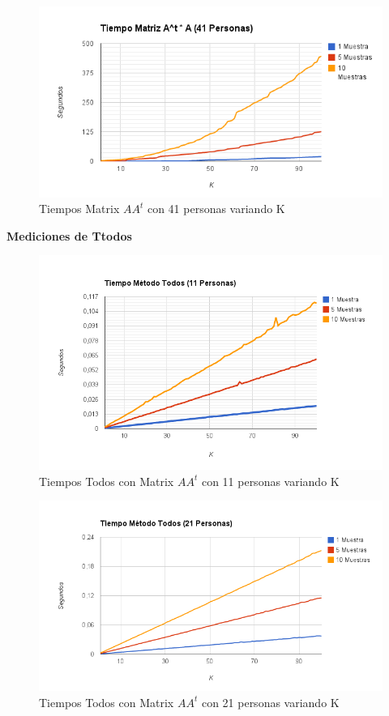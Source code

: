 \begin{figure}[H]
\includegraphics[width=1\textwidth]{img/imagec.png}
     \caption{Tiempos Matrix $AA^t$ con 41 personas variando K}
\end{figure}


\textbf{Mediciones de Ttodos }

\begin{figure}[H]
\includegraphics[width=1\textwidth]{img/imaged.png}
     \caption{Tiempos Todos con Matrix $AA^t$ con 11 personas variando K}
\end{figure}

\begin{figure}[H]
\includegraphics[width=1\textwidth]{img/imagee.png}
     \caption{Tiempos Todos con Matrix $AA^t$ con 21 personas variando K}
\end{figure}

